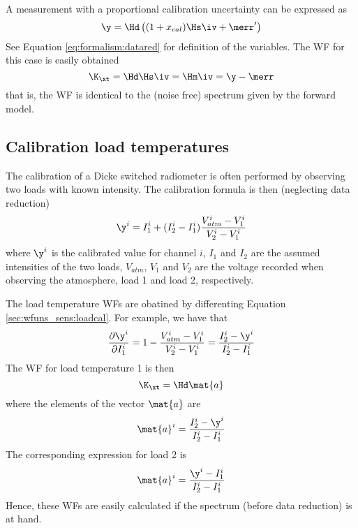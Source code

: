  A measurement with a proportional calibration uncertainty
 can be expressed as
 \begin{equation}
   \y = \Hd\left( (1+x_{cal})\Hs\iv+\merr' \right)
 \end{equation}
 See Equation \ref{eq:formalism:datared} for definition of the variables.
 The WF for this case is easily obtained
 \begin{equation}
   \K_{\xt} = \Hd\Hs\iv = \Hm\iv = \y - \merr
 \end{equation}
 that is, the WF is identical to the (noise free) spectrum given by the forward
 model. 

 
 \subsection{Calibration load temperatures} 
 The calibration of a Dicke switched radiometer is often performed by
 observing two loads with known intensity. The calibration formula is
 then (neglecting data reduction)
 \begin{equation}
   \y^i =  I_1^i + (I_2^i-I_1^i)\frac{V_{atm}^i-V_1^i}{V_2^i-V_1^i} 
  \label{sec:wfuns_sens:loadcal}
 \end{equation}
 where $\y^i$ is the calibrated value for channel $i$, $I_1$ and $I_2$
 are the assumed intensities of the two loads, $V_{atm}$, $V_1$ and
 $V_2$ are the voltage recorded when observing the atmosphere, load 1
 and load 2, respectively.
 
 The load temperature WFs are obatined by differenting Equation
 \ref{sec:wfuns_sens:loadcal}. For example, we have that \citep{eriksson:97a}
 \begin{equation}
   \frac{\partial \y^i}{\partial I_1^i} = 1 - 
     \frac{V_{atm}^i-V_1^i}{V_2^i-V_1^i} = \frac{I_2^i-\y^i}{I_2^i-I_1^i} 
 \end{equation}
 The WF for load temperature 1 is then
 \begin{equation}
   \K_{\xt} = \Hd \mat{a}
 \end{equation}
 where the elements of the vector $\mat{a}$ are
 \begin{equation}
   \mat{a}^i = \frac{I_2^i-\y^i}{I_2^i-I_1^i}
 \end{equation}
 The corresponding expression for load 2 is
 \begin{equation}
   \mat{a}^i = \frac{\y^i-I_1^i}{I_2^i-I_1^i}
 \end{equation}
 Hence, these WFs are easily calculated if the spectrum (before data
 reduction) is at hand.




